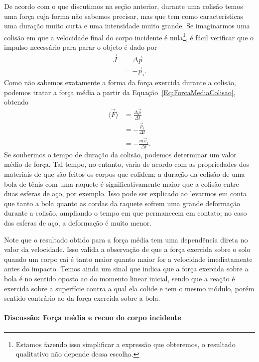 De acordo com o que discutimos na seção anterior, durante uma colisão temos uma força cuja forma não sabemos precisar, mas que tem como características uma duração muito curta e uma intensidade muito grande. Se imaginarmos uma colisão em que a velocidade final do corpo incidente é nula\footnote{Estamos fazendo isso simplificar a expressão que obteremos, o resultado qualitativo não depende dessa escolha.}, é fácil verificar que o impulso necessário para parar o objeto é dado por
\begin{align}
    \vec{J} &= \Delta \vec{p} \\
    &= -\vec{p}_i.
\end{align}
%
Como não sabemos exatamente a forma da força exercida durante a colisão, podemos tratar a força média a partir da  Equação~\eqref{Eq:ForcaMediaColisao}, obtendo
\begin{align}
    \langle\vec{F}\rangle &= \frac{\Delta\vec{p}}{\Delta t} \\
    &= -\frac{\vec{p}_i}{\Delta t} \\
    &= -\frac{m\vec{v}_i}{\Delta t}.
\end{align}
%
Se soubermos o tempo de duração da colisão, podemos determinar um valor médio de força. Tal tempo, no entanto, varia de acordo com as propriedades dos materiais de que são feitos os corpos que colidem: a duração da colisão de uma bola de tênis com uma raquete é significativamente maior que a colisão entre duas esferas de aço, por exemplo. Isso pode ser explicado ao levarmos em conta que tanto a bola quanto as cordas da raquete sofrem uma grande deformação durante a colisão, ampliando o tempo em que permanecem em contato; no caso das esferas de aço, a deformação é muito menor.

Note que o resultado obtido para a força média tem uma dependência direta no valor da velocidade. Isso valida a observação de que a força exercida sobre o solo quando um corpo cai é tanto maior quanto maior for a velocidade imediatamente antes do impacto. Temos ainda um sinal que indica que a força exercida sobre a bola é no sentido oposto ao do momento linear inicial, sendo que a reação é exercida sobre a superfície contra a qual ela colide e tem o mesmo módulo, porém sentido contrário ao da força exercida sobre a bola.

\paragraph{Discussão: Força média e recuo do corpo incidente}

